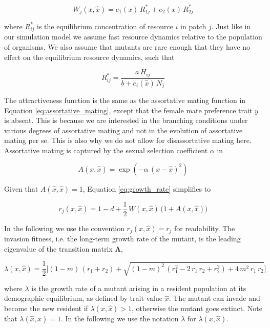 \begin{equation}
    W_j(x, \hat{x}) = e_1(x) \, R^*_{1j} + e_2(x) \, R^*_{2j}
\end{equation}

where $R^*_{ij}$ is the equilibrium concentration of resource $i$ in patch $j$. Just like in our simulation model we assume fast resource dynamics relative to the population of organisms. We also assume that mutants are rare enough that they have no effect on the equilibrium resource dynamics, such that

\begin{equation}
    R^*_{ij} = \frac{a \, H_{ij}}{b + e_i(\hat{x})\,N_j}
\end{equation}

The attractiveness function is the same as the assortative mating function in Equation \ref{eq:assortative_mating}, except that the female mate preference trait $y$ is absent. This is because we are interested in the branching conditions under various degrees of assortative mating and not in the evolution of assortative mating per se. This is also why we do not allow for disassortative mating here. Assortative mating is captured by the sexual selection coefficient $\alpha$ in

\begin{equation}
    A(x, \hat{x}) = \exp{(-\alpha \, (x - \hat{x})^2)}
\end{equation}

Given that $A(\hat{x}, \hat{x}) = 1$, Equation \ref{eq:growth_rate} simplifies to

\begin{equation}
    r_j(x, \hat{x}) = 1 - d + \frac{1}{2} \, W(x, \hat{x}) \, \big(1 + A(x, \hat{x})\big)
\end{equation}

In the following we use the convention $r_j(x, \hat{x}) = r_j$ for readability. The invasion fitness, i.e. the long-term growth rate of the mutant, is the leading eigenvalue of the transition matrix $\pmb{\Lambda}$,

\begin{equation}
    \lambda(x, \hat{x}) = \frac{1}{2} \bigg[(1-m) \, (r_1 + r_2) + \sqrt{(1-m)^2 \, (r_1^2 - 2 \, r_1 \, r_2 + r_2^2) + 4 \, m^2 \, r_1 \, r_2} \bigg]
    \label{eq:invasion_fitness}
\end{equation}

where $\lambda$ is the growth rate of a mutant arising in a resident population at its demographic equilibrium, as defined by trait value $\hat{x}$. The mutant can invade and become the new resident if $\lambda(x, \hat{x}) > 1$, otherwise the mutant goes extinct. Note that $\lambda(\hat{x}, \hat{x}) = 1$. In the following we use the notation $\lambda$ for $\lambda(x, \hat{x})$.

